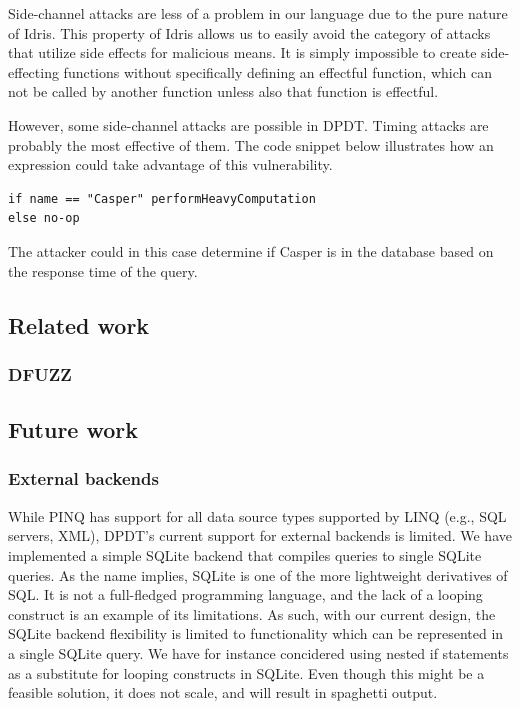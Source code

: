 \documentclass[12pt]{article}
\begin{document}
Side-channel attacks are less of a problem in our language due to the pure nature of Idris.
This property of Idris allows us to easily avoid the category of attacks that utilize side effects for malicious means.
It is simply impossible to create side-effecting functions without specifically defining an effectful function, which can not be called by another function unless also that function is effectful.

However, some side-channel attacks are possible in DPDT.
Timing attacks are probably the most effective of them.
The code snippet below illustrates how an expression could take advantage of this vulnerability.

\begin{lstlisting}
if name == "Casper" performHeavyComputation 
else no-op
\end{lstlisting}

The attacker could in this case determine if Casper is in the database based on the response time of the query.

\subsection{Related work}\label{sec:related_work}

\subsubsection{DFUZZ}


\subsection{Future work}\label{sec:future_work}

\subsubsection{External backends}

While PINQ has support for all data source types supported by LINQ (e.g., SQL servers, XML), DPDT's current support for external backends is limited.
We have implemented a simple SQLite backend that compiles queries to single SQLite queries.
As the name implies, SQLite is one of the more lightweight derivatives of SQL.
It is not a full-fledged programming language, and the lack of a looping construct is an example of its limitations.
As such, with our current design, the SQLite backend flexibility is limited to functionality which can be represented in a single SQLite query.
We have for instance concidered using nested if statements as a substitute for looping constructs in SQLite.
Even though this might be a feasible solution, it does not scale, and will result in spaghetti output.
\end{document}
